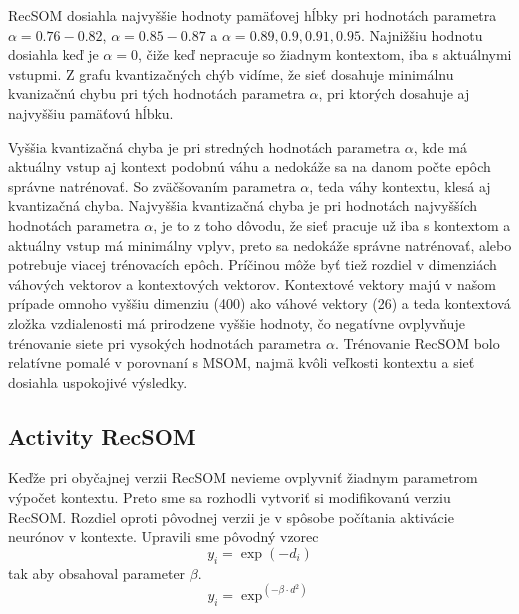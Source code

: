 RecSOM dosiahla najvyššie hodnoty pamäťovej hĺbky pri 
hodnotách parametra $\alpha = 0.76-0.82$, $\alpha = 0.85-0.87$ a $\alpha = 0.89,0.9,0.91,0.95$. 
Najnižšiu hodnotu dosiahla keď je $\alpha = 0$, čiže keď nepracuje so žiadnym kontextom, iba s aktuálnymi vstupmi.
Z grafu kvantizačných chýb vidíme, že sieť dosahuje minimálnu kvanizačnú chybu pri tých
hodnotách parametra $\alpha$, pri ktorých dosahuje aj najvyššiu pamäťovú hĺbku. 

Vyššia kvantizačná chyba je pri stredných hodnotách parametra $\alpha$, kde má aktuálny vstup aj kontext podobnú váhu a nedokáže sa na danom počte epôch správne natrénovať.
So zväčšovaním parametra $\alpha$, teda váhy kontextu, klesá aj kvantizačná chyba.
Najvyššia kvantizačná chyba je pri hodnotách najvyšších hodnotách parametra $\alpha$, je to z toho dôvodu, že sieť 
pracuje už iba s kontextom a aktuálny vstup má minimálny vplyv, preto sa nedokáže správne natrénovať, alebo potrebuje viacej trénovacích epôch.
Príčinou môže byť tiež rozdiel v dimenziách váhových vektorov a kontextových vektorov. Kontextové vektory majú v našom prípade omnoho vyššiu dimenziu (400) ako váhové vektory (26) a 
teda kontextová zložka vzdialenosti má prirodzene vyššie hodnoty, čo negatívne ovplyvňuje trénovanie siete pri vysokých hodnotách parametra $\alpha$.
Trénovanie RecSOM bolo relatívne pomalé v porovnaní s MSOM, najmä kvôli veľkosti kontextu a sieť dosiahla uspokojivé výsledky.



\subsection{Activity RecSOM}
Keďže pri obyčajnej verzii RecSOM nevieme ovplyvniť žiadnym parametrom výpočet kontextu. Preto sme sa 
rozhodli vytvoriť si modifikovanú verziu RecSOM. Rozdiel oproti pôvodnej verzii je v spôsobe počítania 
aktivácie neurónov v kontexte. 
Upravili sme pôvodný vzorec %
\begin{equation}
    y_{i} = \exp{(-d_{i})}
\end{equation}
tak aby obsahoval parameter $\beta$.
\begin{equation}
    y_{i} = \exp^{(-\beta \cdot d^2)}
\end{equation}

